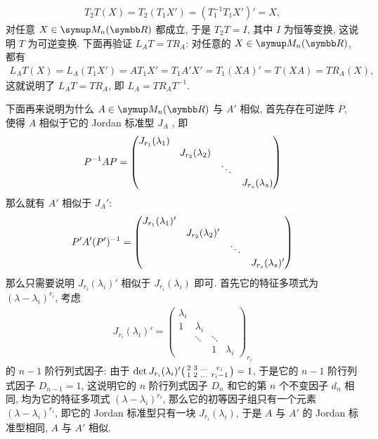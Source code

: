 \begin{exercise}[resume=exer]
\begin{answer}
            \begin{align*}
                T_{2}T(X) = T_{2}(T_{1}X') = (T_{1}^{-1}T_{1}X')' = X,
            \end{align*}
            对任意 $ X \in \MM $ 都成立, 于是 $ T_{2}T = I $, 其中 $ I $ 为恒等变换, 这说明 $ T $ 为可逆变换. 下面再验证 $ L_{A}T = TR_{A} $: 对任意的 $ X \in \MM $, 都有
            \begin{align*}
                L_{A}T(X) = L_{A}(T_{1}X') = AT_{1}X' = T_{1}A'X' = T_{1}(XA)' = T(XA) = TR_{A}(X),
            \end{align*} 
            这就说明了 $ L_{A}T = TR_{A} $, 即 $ L_{A} = TR_{A}T^{-1} $.

            下面再来说明为什么 $ A \in \MM $ 与 $ A' $ 相似, 首先存在可逆阵 $ P $, 使得 $ A $ 相似于它的 Jordan 标准型 $ J_{A} $ , 即
            \begin{align*}
                P^{-1}AP = \mqty(\dmat{J_{r_{1}}(\lambda_{1}), J_{r_{2}}(\lambda_{2}), \ddots, J_{r_{s}}(\lambda_{s})})
            \end{align*}
            那么就有 $ A' $ 相似于 $ J_{A}' $: 
            \begin{align*}
                P'A'(P')^{-1} = \mqty(\dmat{J_{r_{1}}(\lambda_{1})', J_{r_{2}}(\lambda_{2})', \ddots, J_{r_{s}}(\lambda_{s})'})
            \end{align*}
            那么只需要说明 $ J_{r_{i}}(\lambda_{i})' $ 相似于 $ J_{r_{i}}(\lambda_{i}) $ 即可. 首先它的特征多项式为 $ (\lambda - \lambda_{i})^{r_{i}} $, 考虑
            \begin{align*}
                J_{r_{i}}(\lambda_{i})' = \begin{pmatrix}
                    \lambda_{i} & & & \\
                    1 & \lambda_{i} & & \\
                    &  \ddots & \ddots & \\
                    & & 1 & \lambda_{i}
                \end{pmatrix}_{r_{i}}
            \end{align*}
            的 $ n-1 $ 阶行列式因子: 由于 $ \det J_{r_{i}}(\lambda_{i})'\smqty(2 & 3 & \dots & r_{i} \\ 1 & 2 & \dots & r_{i}-1) = 1 $, 于是它的 $ n - 1 $ 阶行列式因子 $ D_{n-1} = 1 $, 这说明它的 $ n $ 阶行列式因子 $ D_{n} $ 和它的第 $ n $ 个不变因子 $ d_{n} $ 相同, 均为它的特征多项式 $ (\lambda - \lambda_{i})^{r_{i}} $, 那么它的初等因子组只有一个元素 $ (\lambda - \lambda_{i})^{r_{i}} $, 即它的 Jordan 标准型只有一块 $ J_{r_{i}}(\lambda_{i}) $, 于是 $ A $ 与 $ A' $ 的 Jordan 标准型相同, $ A $ 与 $ A' $ 相似. 

\end{answer}
\end{exercise}

